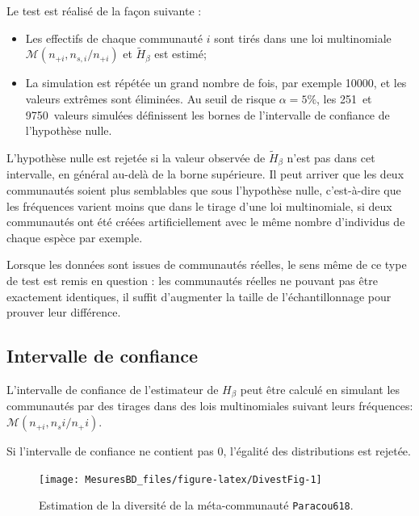 \documentclass[
  11pt,
  french,
  a4paper,
  extrafontsizes,onecolumn,openright
  ]{memoir}
\providecommand{\tightlist}{%
  \setlength{\itemsep}{0pt}\setlength{\parskip}{0pt}}
\begin{document}
Le test est réalisé de la façon suivante \autocite{Marcon2014a}:

\begin{itemize}
\tightlist
\item
  Les effectifs de chaque communauté \(i\) sont tirés dans une loi multinomiale \({\mathcal M}(n_{+i},{n_{s,i}}/{n_{+i}})\) et \({\tilde{H}}_{\beta}\) est estimé;
\item
  La simulation est répétée un grand nombre de fois, par exemple 10000, et les valeurs extrêmes sont éliminées. Au seuil de risque \(\alpha=5\%\), les 251\ieme~et 9750\ieme~valeurs simulées définissent les bornes de l'intervalle de confiance de l'hypothèse nulle.
\end{itemize}

L'hypothèse nulle est rejetée si la valeur observée de \({\tilde{H}}_{\beta}\) n'est pas dans cet intervalle, en général au-delà de la borne supérieure.
Il peut arriver que les deux communautés soient plus semblables que sous l'hypothèse nulle, c'est-à-dire que les fréquences varient moins que dans le tirage d'une loi multinomiale, si deux communautés ont été créées artificiellement avec le même nombre d'individus de chaque espèce par exemple.

Lorsque les données sont issues de communautés réelles, le sens même de ce type de test est remis en question \autocite{Jones1986} : les communautés réelles ne pouvant pas être exactement identiques, il suffit d'augmenter la taille de l'échantillonnage pour prouver leur différence.

\hypertarget{intervalle-de-confiance}{%
\subsection{Intervalle de confiance}\label{intervalle-de-confiance}}

L'intervalle de confiance de l'estimateur de \(H_{\beta}\) \autocite{Marcon2014a} peut être calculé en simulant les communautés par des tirages dans des lois multinomiales suivant leurs fréquences: \({\mathcal M}\left(n_{+i},{n_si}/{n_+i}\right)\).

Si l'intervalle de confiance ne contient pas 0, l'égalité des distributions est rejetée.



\scriptsize

\begin{figure}

{\centering \texttt{[image: MesuresBD\_files/figure-latex/DivestFig-1]} 

}

\caption{Estimation de la diversité de la méta-communauté \texttt{Paracou618}.}\label{fig:DivestFig}
\end{figure}
\end{document}
